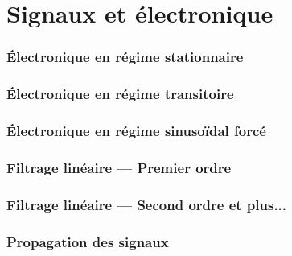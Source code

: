 \setcounter{part}{27}  %

\part{Signaux et électronique}
\section{\'Electronique en régime stationnaire}




\section{\'Electronique en régime transitoire}








%
%


\section{\'Electronique en régime sinusoïdal forcé}






\section{Filtrage linéaire --- Premier ordre}




\section{Filtrage linéaire --- Second ordre et plus...}










\section{Propagation des signaux}

